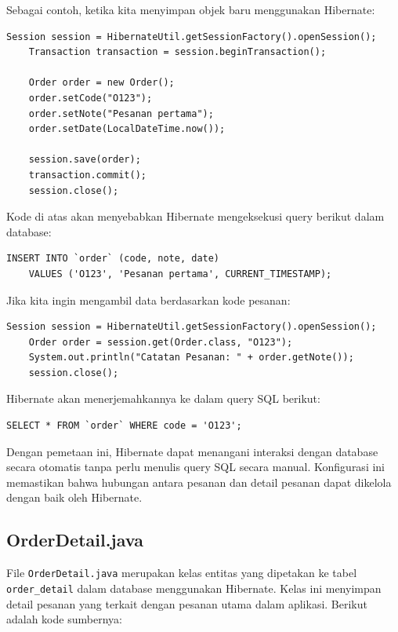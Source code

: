 Sebagai contoh, ketika kita menyimpan objek baru menggunakan Hibernate:

\begin{lstlisting}[style=JavaStyle]
	Session session = HibernateUtil.getSessionFactory().openSession();
	Transaction transaction = session.beginTransaction();
	
	Order order = new Order();
	order.setCode("O123");
	order.setNote("Pesanan pertama");
	order.setDate(LocalDateTime.now());
	
	session.save(order);
	transaction.commit();
	session.close();
\end{lstlisting}

Kode di atas akan menyebabkan Hibernate mengeksekusi query berikut dalam database:

\begin{lstlisting}[style=sql]
	INSERT INTO `order` (code, note, date) 
	VALUES ('O123', 'Pesanan pertama', CURRENT_TIMESTAMP);
\end{lstlisting}

Jika kita ingin mengambil data berdasarkan kode pesanan:

\begin{lstlisting}[style=JavaStyle]
	Session session = HibernateUtil.getSessionFactory().openSession();
	Order order = session.get(Order.class, "O123");
	System.out.println("Catatan Pesanan: " + order.getNote());
	session.close();
\end{lstlisting}

Hibernate akan menerjemahkannya ke dalam query SQL berikut:

\begin{lstlisting}[style=sql]
	SELECT * FROM `order` WHERE code = 'O123';
\end{lstlisting}

Dengan pemetaan ini, Hibernate dapat menangani interaksi dengan database secara otomatis tanpa perlu menulis query SQL secara manual. Konfigurasi ini memastikan bahwa hubungan antara pesanan dan detail pesanan dapat dikelola dengan baik oleh Hibernate.


\subsection{OrderDetail.java}

File \texttt{OrderDetail.java} merupakan kelas entitas yang dipetakan ke tabel \texttt{order\_detail} dalam database menggunakan Hibernate. Kelas ini menyimpan detail pesanan yang terkait dengan pesanan utama dalam aplikasi. Berikut adalah kode sumbernya:

